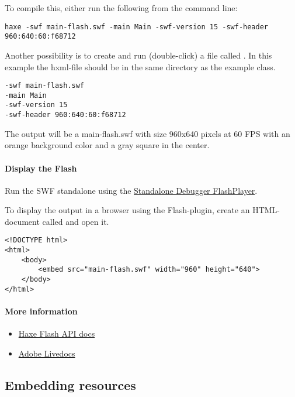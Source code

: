 To compile this, either run the following from the command line:

\begin{lstlisting}
haxe -swf main-flash.swf -main Main -swf-version 15 -swf-header 960:640:60:f68712
\end{lstlisting}

Another possibility is to create and run (double-click) a file called . In this example the hxml-file should be in the same directory as the example class.

\begin{lstlisting}
-swf main-flash.swf
-main Main
-swf-version 15
-swf-header 960:640:60:f68712
\end{lstlisting}

The output will be a main-flash.swf with size 960x640 pixels at 60 FPS with an orange background color and a gray square in the center.

\paragraph{Display the Flash}

Run the SWF standalone using the \href{https://www.adobe.com/support/flashplayer/downloads.html}{Standalone Debugger FlashPlayer}. 

To display the output in a browser using the Flash-plugin, create an HTML-document called  and open it.

\begin{lstlisting}
<!DOCTYPE html>
<html>
	<body>
		<embed src="main-flash.swf" width="960" height="640">
	</body>
</html>
\end{lstlisting}

\paragraph{More information}

\begin{itemize}
	\item \href{http://api.haxe.org/flash/}{Haxe Flash API docs}
	\item \href{http://help.adobe.com/en_US/FlashPlatform/reference/actionscript/3/}{Adobe Livedocs}
\end{itemize}

\subsection{Embedding resources}
\label{target-flash-resources}


